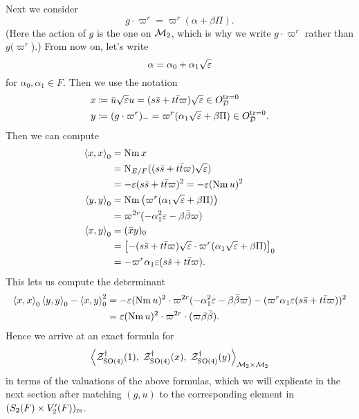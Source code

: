 Next we consider
\[ g \cdot \varpi^r = \varpi^r(\alpha + \beta \Pi). \]
(Here the action of $g$ is the one on $\mathcal M_2$,
which is why we write $g \cdot \varpi^r$ rather than $g(\varpi^r$).)
From now on, let's write
\[ \alpha = \alpha_0 + \alpha_1 \sqrt{\varepsilon} \]
for $\alpha_0, \alpha_1 \in F$.
Then we use the notation
\begin{align*}
  x &\coloneqq \bar u \sqrt{\varepsilon} u = (s \bar s + t \bar t \varpi) \sqrt{\varepsilon} \in O_\mathcal D^{\operatorname{tr} = 0} \\
  y &\coloneqq (g \cdot \varpi^r)_- = \varpi^r(\alpha_1\sqrt{\varepsilon} + \beta \Pi) \in O_\mathcal D^{\operatorname{tr} = 0}.
\end{align*}
Then we can compute
\begin{align*}
  \left\langle x,x \right\rangle _0
  &= \operatorname{Nm} x \\
  &= \operatorname{N}_{E/F}((s \bar s + t \bar t \varpi)\sqrt{\varepsilon}) \\
  &= -\varepsilon(s \bar s + t \bar t \varpi)^2 = -\varepsilon (\operatorname{Nm} u)^2 \\
  \left\langle y,y \right\rangle _0
  &= \operatorname{Nm} \left( \varpi^r(\alpha_1\sqrt{\varepsilon} + \beta \Pi) \right)  \\
  &= \varpi^{2r} (-\alpha_1^2\varepsilon - \beta\bar\beta \varpi) \\
  \left\langle x,y \right\rangle _0 &= (\bar x y)_0 \\
  &= \left[
    -(s \bar s + t \bar t \varpi) \sqrt{\varepsilon}
    \cdot
    \varpi^{r} (\alpha_1\sqrt{\varepsilon} + \beta \Pi)
  \right]_0 \\
  &= - \varpi^r \alpha_1 \varepsilon (s \bar s + t \bar t \varpi).
\end{align*}
This lets us compute the determinant
\begin{align*}
  \left\langle x,x \right\rangle _0 \left\langle y,y \right\rangle _0 - \left\langle x,y \right\rangle^2_0
  &= - \varepsilon (\operatorname{Nm} u)^2\cdot \varpi^{2r}
    (-\alpha_1^2 \varepsilon - \beta \bar\beta \varpi)
  - (\varpi^r \alpha_1 \varepsilon (s \bar s + t \bar t \varpi))^2 \\
  &= \varepsilon (\operatorname{Nm} u)^2\cdot \varpi^{2r} \cdot
    (\varpi \beta \bar\beta).
\end{align*}
Hence we arrive at an exact formula for
\[ \left< \mathcal Z^{\dagger}_{\operatorname{SO}(4)}(1), \; \mathcal Z^{\dagger}_{\operatorname{SO}(4)}(x), \; \mathcal Z^{\dagger}_{\operatorname{SO}(4)}(y) \right>_{\mathcal M_2 \times \mathcal M_2} \]
in terms of the valuations of the above formulas,
which we will explicate in the next section after matching $(g,u)$
to the corresponding element in $(S_2(F) \times V_2'(F))_{\mathrm{rs}}$.
